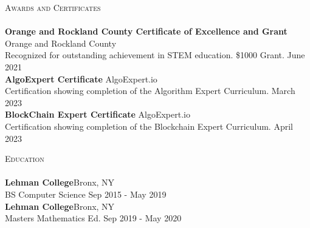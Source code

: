 \documentclass[a4paper]{article}
\newcommand{\lineunder} {
    \vspace*{-8pt} \\
    \hspace*{-18pt} \hrulefill \\
}
\newcommand{\header} [1] {
    {\hspace*{-18pt}\vspace*{6pt} \textsc{#1}}
    \vspace*{-6pt} \lineunder
}
\begin{document}
\header{Awards and Certificates}
\textbf{Orange and Rockland County Certificate of Excellence and Grant} \hfill Orange and Rockland County\\
Recognized for outstanding achievement in STEM education. \$1000 Grant. \hfill June 2021\\
\vspace*{2mm}
\textbf{AlgoExpert Certificate} \hfill AlgoExpert.io\\
Certification showing completion of the Algorithm Expert Curriculum. \hfill March 2023\\
\vspace*{2mm}
\textbf{BlockChain Expert Certificate} \hfill AlgoExpert.io\\
Certification showing completion of the Blockchain Expert Curriculum. \hfill April 2023\\
\vspace*{2mm}

\header{Education}
\textbf{Lehman College}\hfill Bronx, NY\\
BS Computer Science \hfill Sep 2015 - May 2019\\
\vspace{2mm}
\textbf{Lehman College}\hfill Bronx, NY\\
Masters Mathematics Ed. \hfill Sep 2019 - May 2020\\
\vspace{2mm}

\ 
\end{document}

